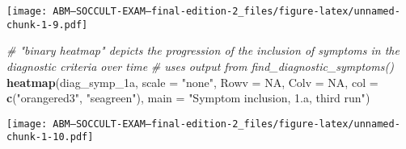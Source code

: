 \documentclass[]{article}
\newenvironment{Shaded}{\begin{snugshade}}{\end{snugshade}}
\newcommand{\KeywordTok}[1]{\textcolor[rgb]{0.13,0.29,0.53}{\textbf{#1}}}
\newcommand{\DataTypeTok}[1]{\textcolor[rgb]{0.13,0.29,0.53}{#1}}
\newcommand{\DecValTok}[1]{\textcolor[rgb]{0.00,0.00,0.81}{#1}}
\newcommand{\StringTok}[1]{\textcolor[rgb]{0.31,0.60,0.02}{#1}}
\newcommand{\CommentTok}[1]{\textcolor[rgb]{0.56,0.35,0.01}{\textit{#1}}}
\newcommand{\OtherTok}[1]{\textcolor[rgb]{0.56,0.35,0.01}{#1}}
\newcommand{\OperatorTok}[1]{\textcolor[rgb]{0.81,0.36,0.00}{\textbf{#1}}}
\newcommand{\NormalTok}[1]{#1}
\begin{document}
\begin{Shaded}
\end{Shaded}

\texttt{[image: ABM---SOCCULT-EXAM---final-edition-2\_files/figure-latex/unnamed-chunk-1-9.pdf]}

\begin{Shaded}
\begin{Highlighting}[]
\CommentTok{# "binary heatmap" depicts the progression of the inclusion of symptoms in the diagnostic criteria over time}
\CommentTok{# uses output from find_diagnostic_symptoms()}
\KeywordTok{heatmap}\NormalTok{(diag_symp_1a, }\DataTypeTok{scale =} \StringTok{"none"}\NormalTok{, }\DataTypeTok{Rowv =} \OtherTok{NA}\NormalTok{, }\DataTypeTok{Colv =} \OtherTok{NA}\NormalTok{, }\DataTypeTok{col =} \KeywordTok{c}\NormalTok{(}\StringTok{"orangered3"}\NormalTok{, }\StringTok{"seagreen"}\NormalTok{), }\DataTypeTok{main =} \StringTok{"Symptom inclusion, 1.a, third run"}\NormalTok{) }
\end{Highlighting}
\end{Shaded}

\texttt{[image: ABM---SOCCULT-EXAM---final-edition-2\_files/figure-latex/unnamed-chunk-1-10.pdf]}
\end{document}
